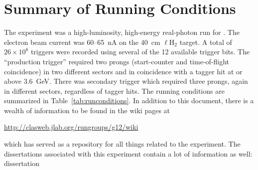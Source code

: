 \section{Summary of Running Conditions}

The  experiment was a high-luminosity, high-energy real-photon run for . The electron beam current was 60--65~nA on the 40~cm $\ell$H$_2$ target. A total of $26\times 10^8$ triggers were recorded using several of the 12 available trigger bits. The ``production trigger'' required two prongs (start-counter and time-of-flight coincidence) in two different sectors and in coincidence with a tagger hit at or above 3.6~GeV. There was secondary trigger which required three prongs, again in different sectors, regardless of tagger hits. The running conditions are summarized in Table~\ref{tab:runconditions}. In addition to this document, there is a wealth of information to be found in the wiki pages at
\begin{center}
    \url{http://clasweb.jlab.org/rungroups/g12/wiki}
\end{center}
which has served as a repository for all things related to the  experiment. The dissertations associated with this experiment contain a lot of information as well:
dissertation







